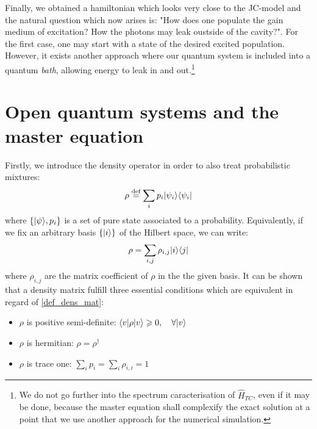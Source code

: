 \documentclass[11pt]{report}
\DeclarePairedDelimiter\bra{\langle}{\rvert}
\DeclarePairedDelimiter\ket{\lvert}{\rangle}
\begin{document}
Finally, we obtained a hamiltonian which looks very close to the JC-model and the natural question which now arises is: "How does one populate the gain medium of excitation? How the photons may leak oustside of the cavity?". For the first case, one may start with a state of the desired excited population. However, it exists another approach where our quantum system is included into a quantum \textit{bath}, allowing energy to leak in and out.\footnote{We do not go further into the spectrum caracterisation of $\hat{H}_{TC}$, even if it may be done, because the master equation shall complexify the exact solution at a point that we use another approach for the numerical simulation.}

\section{Open quantum systems and the master equation}

Firstly, we introduce the density operator in order to also treat probabilistic mixtures:
\begin{equation}
\label{def_dens_mat}
\rho \stackrel{\text{def}}{=} \sum_i p_i \ket{\psi_i}\bra{\psi_i}
\end{equation}
where $\left\lbrace \ket{\psi}, p_i \right\rbrace$ is a set of pure state associated to a probability. Equivalently, if we fix an arbitrary basis $\left\lbrace \ket{i} \right\rbrace$ of the Hilbert space, we can write:
\begin{equation}
\label{deftwo_dens_mat}
\rho = \sum_{i,j} \rho_{i,j} \ket{i}\bra{j}
\end{equation}
where $\rho_{i,j}$ are the matrix coefficient of $\rho$ in the the given basis. It can be shown that a density matrix fulfill three essential conditions which are equivalent in regard of \eqref{def_dens_mat}:
\begin{itemize}
	\item $\rho$ is positive semi-definite: $\bra{v} \rho \ket{v} \geqslant 0, \quad \forall \ket{v}$
	\item $\rho$ is hermitian: $\rho = \rho^\dagger$
	\item $\rho$ is trace one: $\sum_i p_i = \sum_i \rho_{i, i} = 1$
\end{itemize}
\end{document}
